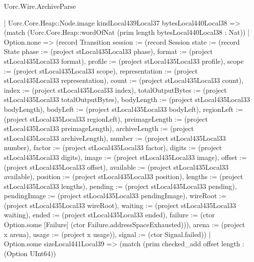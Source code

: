 \begin{lexlean}{Uorc.Wire.ArchiveParse}
\begin{semanticmodule}
{        | Uorc.Core.Heap::Node.image kindLocal439Local37 bytesLocal440Local38 => (match (Uorc.Core.Heap::wordOfNat (prim length bytesLocal440Local38 : Nat))
          | Option.none => (record Transition {session := (record Session {state := (record State {phase := (project stLocal435Local33 phase), format := (project stLocal435Local33 format), profile := (project stLocal435Local33 profile), scope := (project stLocal435Local33 scope), representation := (project stLocal435Local33 representation), count := (project stLocal435Local33 count), index := (project stLocal435Local33 index), totalOutputBytes := (project stLocal435Local33 totalOutputBytes), bodyLength := (project stLocal435Local33 bodyLength), bodyLeft := (project stLocal435Local33 bodyLeft), regionLeft := (project stLocal435Local33 regionLeft), preimageLength := (project stLocal435Local33 preimageLength), archiveLength := (project stLocal435Local33 archiveLength), number := (project stLocal435Local33 number), factor := (project stLocal435Local33 factor), digits := (project stLocal435Local33 digits), image := (project stLocal435Local33 image), offset := (project stLocal435Local33 offset), available := (project stLocal435Local33 available), position := (project stLocal435Local33 position), lengths := (project stLocal435Local33 lengths), pending := (project stLocal435Local33 pending), pendingImage := (project stLocal435Local33 pendingImage), wireRoot := (project stLocal435Local33 wireRoot), waiting := (project stLocal435Local33 waiting), ended := (project stLocal435Local33 ended), failure := (ctor Option.some [Failure] (ctor Failure.addressSpaceExhausted))}), arena := (project x arena), usage := (project x usage)}), signal := (ctor Signal.failed)})
          | Option.some sizeLocal441Local39 => (match (prim checked_add offset length : (Option UInt64))
}
\end{semanticmodule}
\end{lexlean}
